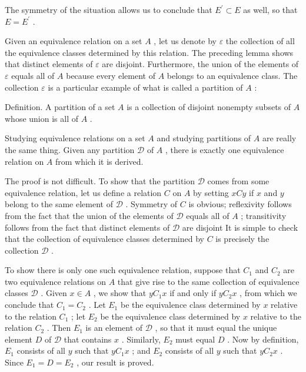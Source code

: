 \documentclass[10pt]{article}
\begin{document}
The symmetry of the situation allows us to conclude that \({E}^{\prime } \subset  E\) as well, so that \(E = {E}^{\prime }\) .

Given an equivalence relation on a set \(A\) , let us denote by \(\varepsilon\) the collection of all the equivalence classes determined by this relation. The preceding lemma shows that distinct elements of \(\varepsilon\) are disjoint. Furthermore, the union of the elements of \(\varepsilon\) equals all of \(A\) because every element of \(A\) belongs to an equivalence class. The collection \(\varepsilon\) is a particular example of what is called a partition of \(A\) :

Definition. A partition of a set \(A\) is a collection of disjoint nonempty subsets of \(A\) whose union is all of \(A\) .

Studying equivalence relations on a set \(A\) and studying partitions of \(A\) are really the same thing. Given any partition \(\mathcal{D}\) of \(A\) , there is exactly one equivalence relation on \(A\) from which it is derived.

The proof is not difficult. To show that the partition \(\mathcal{D}\) comes from some equivalence relation, let us define a relation \(C\) on \(A\) by setting \({xCy}\) if \(x\) and \(y\) belong to the same element of \(\mathcal{D}\) . Symmetry of \(C\) is obvious; reflexivity follows from the fact that the union of the elements of \(\mathcal{D}\) equals all of \(A\) ; transitivity follows from the fact that distinct elements of \(\mathcal{D}\) are disjoint It is simple to check that the collection of equivalence classes determined by \(C\) is precisely the collection \(\mathcal{D}\) .

To show there is only one such equivalence relation, suppose that \({C}_{1}\) and \({C}_{2}\) are two equivalence relations on \(A\) that give rise to the same collection of equivalence classes \(\mathcal{D}\) . Given \(x \in  A\) , we show that \(y{C}_{1}x\) if and only if \(y{C}_{2}x\) , from which we conclude that \({C}_{1} = {C}_{2}\) . Let \({E}_{1}\) be the equivalence class determined by \(x\) relative to the relation \({C}_{1}\) ; let \({E}_{2}\) be the equivalence class determined by \(x\) relative to the relation \({C}_{2}\) . Then \({E}_{1}\) is an element of \(\mathcal{D}\) , so that it must equal the unique element \(D\) of \(\mathcal{D}\) that contains \(x\) . Similarly, \({E}_{2}\) must equal \(D\) . Now by definition, \({E}_{1}\) consists of all \(y\) such that \(y{C}_{1}x\) ; and \({E}_{2}\) consists of all \(y\) such that \(y{C}_{2}x\) . Since \({E}_{1} = D = {E}_{2}\) , our result is proved.
\end{document}
